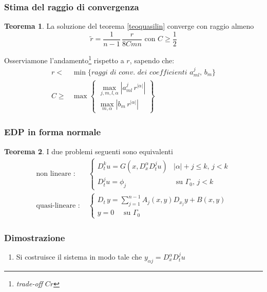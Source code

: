 \documentclass[serif,notheorems]{beamer}
\theoremstyle{definition} %
\newtheorem{theorem}{Teorema}[section] %
\theoremstyle{remark}
\begin{document}
\begin{frame}
\frametitle{Stima del raggio di convergenza}
\begin{theorem}
La soluzione del teorema \ref{teoquasilin} converge con raggio almeno
$$\widetilde{r} = \dfrac{1}{n-1}\, \dfrac{r}{8Cmn} \text{ con } C \geq \frac{1}{2}$$
\end{theorem}

Osserviamone l'andamento\footnote{\textit{trade-off} $Cr$} rispetto a $r$, sapendo che:
\begin{align*}
r <& \min \{ \textit{raggi di conv. dei coefficienti } a^j_{ml}, \, b_m\} \\
C \geq & \max \begin{Bmatrix}
\max\limits_{j,m,l,\alpha } \left|a^j_{ml} \, r^{|\alpha |}\right|\\
\max\limits_{m,\alpha} \left|b_m \, r^{|\alpha |}\right|
\end{Bmatrix}
\end{align*}
\end{frame}

\begin{frame}
\frametitle{EDP in forma normale}
\begin{theorem}
I due problemi seguenti sono equivalenti
\begin{align*}
\text{non lineare : }&
\begin{cases}
D_{t}^k u = G(x, D^\alpha_x D^j_t u) & |\alpha |+ j \leq k, \, j<k \\
D_t^ju = \phi_j & \text{ su } \Gamma_0, \, j<k
\end{cases} \\
\text{quasi-lineare : }&
\begin{cases}
D_t \, y = \sum\limits_{j=1}^{n-1} A_j(x,y)D_{x_j}y+B(x,y) \; \\
y=0 \quad \text{ su } \Gamma_0
\end{cases}
\end{align*}
\end{theorem}
\end{frame}

\begin{frame}
\frametitle{Dimostrazione}
\begin{enumerate}
\item Si costruisce il sistema in modo tale che $y_{\alpha j}= D^\alpha_x D^j_t u$ 
\end{enumerate}
\end{frame}
\end{document}
